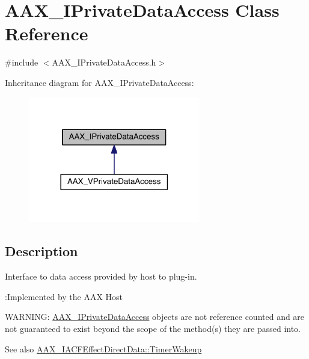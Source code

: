 \hypertarget{a00111}{}\section{A\+A\+X\+\_\+\+I\+Private\+Data\+Access Class Reference}
\label{a00111}


{\ttfamily \#include $<$A\+A\+X\+\_\+\+I\+Private\+Data\+Access.\+h$>$}



Inheritance diagram for A\+A\+X\+\_\+\+I\+Private\+Data\+Access\+:
\nopagebreak
\begin{figure}[H]
\begin{center}
\leavevmode
\includegraphics[width=213pt]{a00655}
\end{center}
\end{figure}


\subsection{Description}
Interface to data access provided by host to plug-\/in. 

\begin{DoxyRefDesc}{\+:\+Implemented by the A\+A\+X Host}
\item[\hyperlink{a00001__aax_host_implementation000010}{\+:\+Implemented by the A\+A\+X Host}]\end{DoxyRefDesc}


W\+A\+R\+N\+I\+N\+G\+: \hyperlink{a00111}{A\+A\+X\+\_\+\+I\+Private\+Data\+Access} objects are not reference counted and are not guaranteed to exist beyond the scope of the method(s) they are passed into.

\begin{DoxySeeAlso}{See also}
\hyperlink{a00059_afb4fa2c566547d7bd303166cf50741bb}{A\+A\+X\+\_\+\+I\+A\+C\+F\+Effect\+Direct\+Data\+::\+Timer\+Wakeup} 
\end{DoxySeeAlso}
